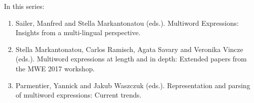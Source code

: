 














In this series:

\begin{enumerate}
\item Sailer, Manfred and Stella Markantonatou (eds.). Multiword Expressions: Insights from a multi-lingual perspective.
\item Stella Markantonatou, Carlos Ramisch, Agata Savary and Veronika Vincze (eds.). Multiword expressions at length and in depth: Extended papers from the MWE 2017 workshop.
\item Parmentier, Yannick and Jakub Waszczuk (eds.). Representation and parsing of multiword expressions: Current trends.
\end{enumerate}
